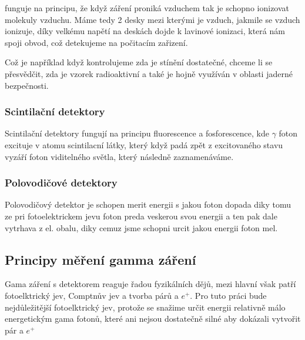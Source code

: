 \cite{Knoll2010} 

 funguje na principu, že když záření proniká vzduchem tak je schopno ionizovat molekuly vzduchu. Máme tedy 2 desky mezi kterými je vzduch, jakmile se vzduch ionizuje, díky velkému napětí na deskách dojde k lavinové ionizaci, která nám spoji obvod, což detekujeme na počitacím zařizení. 
 
 Což je například když kontrolujeme zda je stínění dostatečné, chceme li se přesvědčit, zda je vzorek radioaktivní a také je hojně využíván v oblasti  jaderné bezpečnosti.
\subsubsection{Scintilační detektory}
Scintilační detektory fungují na principu fluorescence a fosforescence, kde $\gamma$ foton excituje \e v atomu scintilacní látky, který když padá zpět z excitovaného stavu vyzáří foton viditelného světla, který následně zaznamenáváme.\cite{Knoll2010, Scintilators}
\subsubsection{Polovodičové detektory}
Polovodičový detektor je schopen merit energii s jakou foton dopada diky tomu ze pri fotoelektrickem jevu foton preda veskerou svou energii \e a ten pak dale vytrhava \e z el. obalu, diky cemuz jsme schopni urcit jakou energii foton mel. %

\subsection{Principy měření gamma záření}%
Gama záření s detektorem reaguje řadou fyzikálních dějů, mezi hlavní však patří fotoelktrický jev, Comptnův jev a tvorba párů \e a $e^+$. Pro tuto práci bude nejdůležitější fotoelktrický jev, protože se snažime určit energii relativně málo energetickým gama fotonů, které ani nejsou dostatečně silné aby dokázali vytvořit pár \e a $e^+$ \cite{DusanBc}
